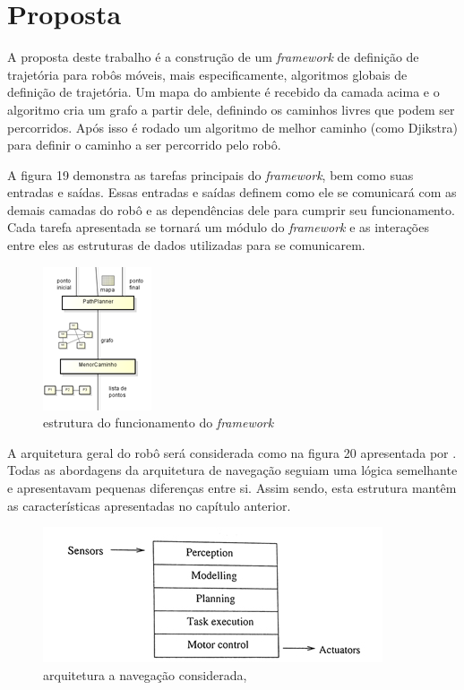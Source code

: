 \chapter[Proposta]{Proposta}

A proposta deste trabalho é a construção de um \textit{framework} de definição de trajetória para robôs móveis, mais especificamente, algoritmos globais de definição de trajetória. Um mapa do ambiente é recebido da camada acima e o algoritmo cria um grafo a partir dele, definindo os caminhos livres que podem ser percorridos. Após isso é rodado um algoritmo de melhor caminho (como Djikstra) para definir o caminho a ser percorrido pelo robô. 

A figura 19 demonstra as tarefas principais do \textit{framework}, bem como suas entradas e saídas. Essas entradas e saídas definem como ele se comunicará com as demais camadas do robô e as dependências dele para cumprir seu funcionamento. Cada tarefa apresentada se tornará um módulo do \textit{framework} e as interações entre eles as estruturas de dados utilizadas para se comunicarem.
 
\begin{figure}[h]
	\centering
	\label{fig19}
		\includegraphics[keepaspectratio=true,scale=1]{figuras/framework.png}
	\caption{estrutura do funcionamento do \textit{framework}}
\end{figure} 

A arquitetura geral do robô será considerada como na figura 20 apresentada por \cite{Nehmzow2003}. Todas as abordagens da arquitetura de navegação seguiam uma lógica semelhante e apresentavam pequenas diferenças entre si. Assim sendo, esta estrutura mantêm as características apresentadas no capítulo anterior.

\begin{figure}[h]
	\centering
	\label{fig20}
		\includegraphics[keepaspectratio=true,scale=1]{figuras/arqusada.jpg}
	\caption{arquitetura a navegação considerada, \cite{Nehmzow2003}}
\end{figure}

